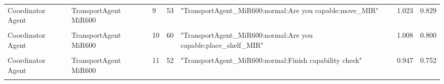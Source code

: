 \begin{table}[htbp]
\begin{tabular}{m{} m{} m{} m{} m{} m{} m{}}
    Coordinator Agent & TransportAgent MiR600 & 9  & 53  & "TransportAgent\_MiR600:normal:Are you capable:move\_MIR"                                                                                                                                                                                                                                                                                                                                                                                                                                                                                                                                                                                                                                & 1.023 & 0.829 \\ 
    & & & & & &\\
    Coordinator Agent & TransportAgent MiR600 & 10 & 60  & "TransportAgent\_MiR600:normal:Are you capable:place\_shelf\_MIR"                                                                                                                                                                                                                                                                                                                                                                                                                                                                                                                                                                                                                        & 1.008 & 0.800 \\ 
    & & & & & &\\
    Coordinator Agent & TransportAgent MiR600 & 11 & 52  & "TransportAgent\_MiR600:normal:Finish capability check"                                                                                                                                                                                                                                                                                                                                                                                                                                                                                                                                                                                                                                  & 0.947 & 0.752 \\ 
    & & & & & &\\

\end{tabular}
\end{table}
